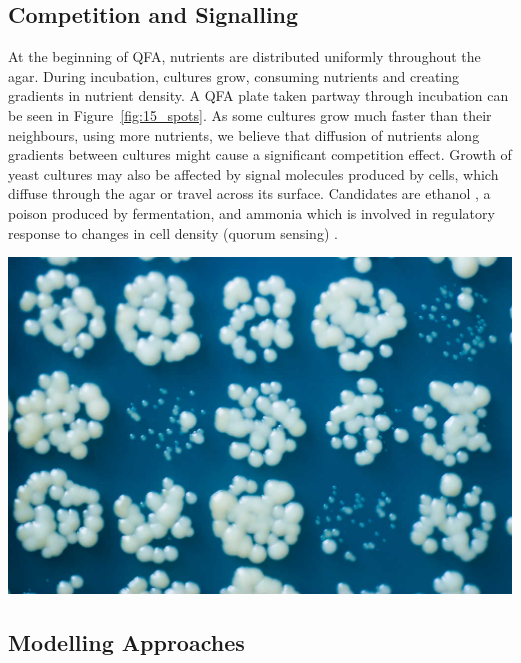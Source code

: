 \begin{multicols}{2}


\subsection{Competition and Signalling}

At the beginning of QFA, nutrients are distributed uniformly throughout the
agar. During incubation, cultures grow, consuming nutrients and creating gradients in
nutrient density. A QFA plate taken partway through incubation can be
seen in Figure~\ref{fig:15_spots}. As some cultures grow much faster than their
neighbours, using more nutrients, we believe that diffusion of nutrients along gradients
between cultures might cause a significant competition effect. Growth of yeast cultures
may also be affected by signal molecules produced by cells, which diffuse through the
agar or travel across its surface. Candidates are ethanol \citep{fujita2006}, a poison
produced by fermentation, and ammonia which is involved in regulatory response
to changes in cell density (quorum sensing) \citep{sprague2006,honigberg2011}.

\begin{Figure}
  \centering
  \includegraphics[width=\linewidth]{5658435523_c2e43729f1_b}
  \label{fig:15_spots}
\end{Figure}

\subsection{Modelling Approaches}


\end{multicols}
